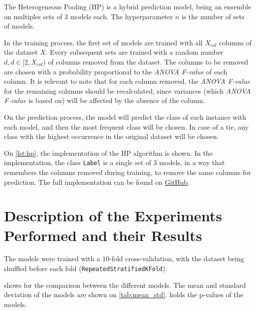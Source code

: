 \documentclass[review]{elsarticle}
\let\mono\texttt%
\begin{document}
The Heterogeneous Pooling (HP) is a hybrid prediction model, being an ensemble on multiples sets of $3$ models each. The hyperparameter $n$ is the number of sets of models.

In the training process, the first set of models are trained with all $X_{col}$ columns of the dataset $X$. Every subsequent sets are trained with a random number $d, d \in [2,X_{col})$ of columns removed from the dataset. The columns to be removed are chosen with a probability proportional to the \emph{ANOVA F-value} of each column. It is relevant to note that for each column removed, the  \emph{ANOVA F-value} for the remaining columns should be recalculated, since variances (which \emph{ANOVA F-value} is based on) will be affected by the absence of the column.

On the prediction process, the model will predict the class of each instance with each model, and then the most frequent class will be chosen. In case of a tie, any class with the highest occurrence in the original dataset will be chosen.

On \cref{lst:hp}, the implementation of the HP algorithm is shown. In the implementation, the class \lstinline{Label} is a single set of $3$ models, in a way that remembers the columns removed during training, to remove the same columns for prediction. The full implementation can be found on \href{https://github.com/Henriquelay/AI-classes/blob/main/Trab1/Trab1_Henrique_Layber.ipynb}{GitHub}.

\section{Description of the Experiments Performed and their Results}

The models were trained with a $10$-fold cross-validation, with the dataset being shuffled before each fold (\mono{RepeatedStratifiedKFold}).

 shows for the comparison between the different models. The mean and standard deviation of the models are shown on \cref{tab:mean_std}.  holds the p-values of the models.
\end{document}
